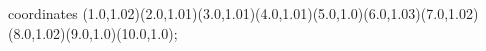 					coordinates { (1.0,1.02)(2.0,1.01)(3.0,1.01)(4.0,1.01)(5.0,1.0)(6.0,1.03)(7.0,1.02)(8.0,1.02)(9.0,1.0)(10.0,1.0)};